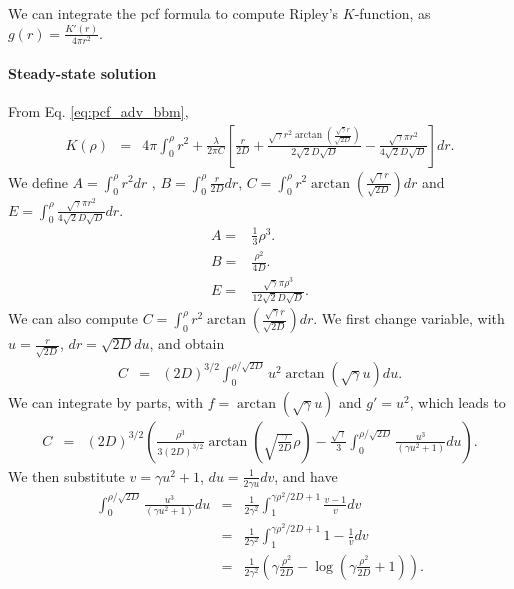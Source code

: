 \documentclass[english]{article}
\begin{document}
We can integrate the pcf formula to compute Ripley's $K$-function,
as $g(r)=\frac{K'(r)}{4\pi r^{2}}$.

\paragraph{Steady-state solution}

From Eq. \ref{eq:pcf_adv_bbm},
\begin{equation}
\begin{array}{ccc}
K(\rho) & = & 4\pi\int_{0}^{\rho}r^{2}+\frac{\lambda}{2\pi C}\left[\frac{r}{2D}+\frac{\sqrt{\gamma}r^{2}\arctan\left(\frac{\sqrt{\gamma}r}{\sqrt{2D}}\right)}{2\sqrt{2}D\sqrt{D}}-\frac{\sqrt{\gamma}\pi r^{2}}{4\sqrt{2}D\sqrt{D}}\right]dr.\end{array}\label{eq:start-K}
\end{equation}
We define $A=\int_{0}^{\rho}r^{2}dr$ , $B=\int_{0}^{\rho}\frac{r}{2D}dr$,
$C=\int_{0}^{\rho}r^{2}\arctan\left(\frac{\sqrt{\gamma}r}{\sqrt{2D}}\right)dr$
and $E=\int_{0}^{\rho}\frac{\sqrt{\gamma}\pi r^{2}}{4\sqrt{2}D\sqrt{D}}dr$.
\begin{equation}
\begin{array}{cc}
A= & \frac{1}{3}\rho^{3}.\\
B= & \frac{\rho^{2}}{4D}.\\
E= & \frac{\sqrt{\gamma}\pi\rho^{3}}{12\sqrt{2}D\sqrt{D}}.
\end{array}
\end{equation}
We can also compute $C=\int_{0}^{\rho}r^{2}\arctan\left(\frac{\sqrt{\gamma}r}{\sqrt{2D}}\right)dr$.
We first change variable, with $u=\frac{r}{\sqrt{2D}}$, $dr=\sqrt{2D}du$,
and obtain
\begin{equation}
\begin{array}{ccc}
C & = & (2D)^{3/2}\int_{0}^{\rho/\sqrt{2D}}u^{2}\arctan(\sqrt{\gamma}u)du.\end{array}
\end{equation}
We can integrate by parts, with $f=\arctan(\sqrt{\gamma}u)$ and $g'=u^{2}$,
which leads to
\begin{equation}
\begin{array}{ccc}
C & = & (2D)^{3/2}\left(\frac{\rho^{3}}{3(2D)^{3/2}}\arctan(\sqrt{\frac{\gamma}{2D}}\rho)-\frac{\sqrt{\gamma}}{3}\int_{0}^{\rho/\sqrt{2D}}\frac{u^{3}}{(\gamma u^{2}+1)}du\right).\end{array}
\end{equation}
We then substitute $v=\gamma u^{2}+1$, $du=\frac{1}{2\gamma u}dv$,
and have
\begin{equation}
\begin{array}{ccc}
\int_{0}^{\rho/\sqrt{2D}}\frac{u^{3}}{(\gamma u^{2}+1)}du & = & \frac{1}{2\gamma^{2}}\int_{1}^{\gamma\rho^{2}/2D+1}\frac{v-1}{v}dv\\
 & = & \frac{1}{2\gamma^{2}}\int_{1}^{\gamma\rho^{2}/2D+1}1-\frac{1}{v}dv\\
 & = & \frac{1}{2\gamma^{2}}(\gamma\frac{\rho^{2}}{2D}-\log(\gamma\frac{\rho^{2}}{2D}+1)).
\end{array}
\end{equation}
\end{document}
